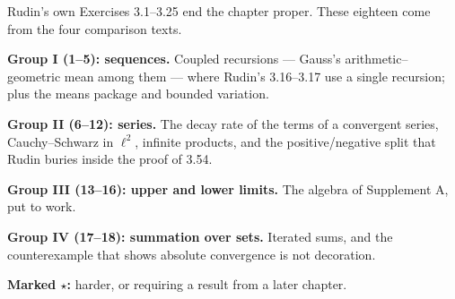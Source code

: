
\begin{roadmap}
Rudin's own Exercises 3.1--3.25 end the chapter proper. These eighteen come
from the four comparison texts.

\medskip
\raggedright
\textbf{Group I (1--5): sequences.} Coupled recursions --- Gauss's
arithmetic--geometric mean among them --- where Rudin's 3.16--3.17 use a
single recursion; plus the means package and bounded variation.

\medskip
\textbf{Group II (6--12): series.} The decay rate of the terms of a
convergent series, Cauchy--Schwarz in $\ell^2$, infinite products, and the
positive/negative split that Rudin buries inside the proof of 3.54.

\medskip
\textbf{Group III (13--16): upper and lower limits.} The algebra of
Supplement A, put to work.

\medskip
\textbf{Group IV (17--18): summation over sets.} Iterated sums, and the
counterexample that shows absolute convergence is not decoration.

\medskip
\textbf{Marked $\star$:} harder, or requiring a result from a later chapter.
\end{roadmap}

